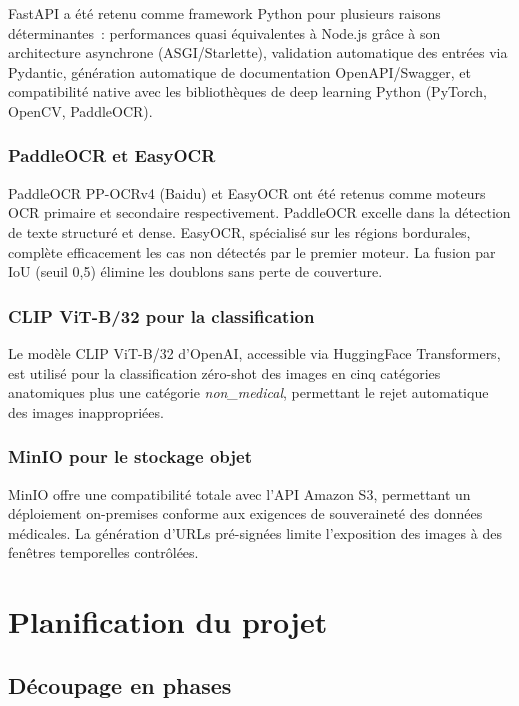 FastAPI a été retenu comme framework Python pour plusieurs raisons déterminantes~: performances quasi équivalentes à Node.js grâce à son architecture asynchrone (ASGI/Starlette), validation automatique des entrées via Pydantic, génération automatique de documentation OpenAPI/Swagger, et compatibilité native avec les bibliothèques de deep learning Python (PyTorch, OpenCV, PaddleOCR).

\subsubsection{PaddleOCR et EasyOCR}

PaddleOCR PP-OCRv4 (Baidu) et EasyOCR ont été retenus comme moteurs OCR primaire et secondaire respectivement. PaddleOCR excelle dans la détection de texte structuré et dense. EasyOCR, spécialisé sur les régions bordurales, complète efficacement les cas non détectés par le premier moteur. La fusion par IoU (seuil 0,5) élimine les doublons sans perte de couverture.

\subsubsection{CLIP ViT-B/32 pour la classification}

Le modèle CLIP ViT-B/32 d'OpenAI, accessible via HuggingFace Transformers, est utilisé pour la classification zéro-shot des images en cinq catégories anatomiques plus une catégorie \textit{non\_medical}, permettant le rejet automatique des images inappropriées.

\subsubsection{MinIO pour le stockage objet}

MinIO offre une compatibilité totale avec l'API Amazon S3, permettant un déploiement on-premises conforme aux exigences de souveraineté des données médicales. La génération d'URLs pré-signées limite l'exposition des images à des fenêtres temporelles contrôlées.

\section{Planification du projet}

\subsection{Découpage en phases}

